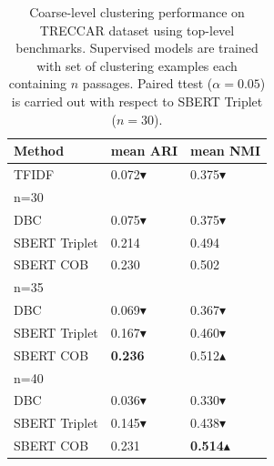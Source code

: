 \documentclass[11pt,a4paper]{article}
\begin{document}
\begin{table}[h]
\caption{Coarse-level clustering performance on TRECCAR dataset using top-level benchmarks. Supervised models are trained with set of clustering examples each containing $n$ passages. Paired ttest ($\alpha=0.05$) is carried out with respect to SBERT Triplet ($n=30$).}
\label{tab:trecexp}
\begin{tabular}{lll}
\hline
Method        & mean ARI & mean NMI \\ \hline
TFIDF         & 0.072$\blacktriangledown$ & 0.375$\blacktriangledown$ \\ \hline
n=30&&\\
DBC           & 0.075$\blacktriangledown$ & 0.375$\blacktriangledown$ \\ 
SBERT Triplet & 0.214 & 0.494 \\
SBERT COB     & 0.230 & 0.502 \\ \hline
n=35&&\\
DBC           & 0.069$\blacktriangledown$ & 0.367$\blacktriangledown$ \\ 
SBERT Triplet & 0.167$\blacktriangledown$ & 0.460$\blacktriangledown$ \\
SBERT COB     & \textbf{0.236} & 0.512$\blacktriangle$ \\ \hline
n=40&&\\
DBC           & 0.036$\blacktriangledown$ & 0.330$\blacktriangledown$ \\ 
SBERT Triplet & 0.145$\blacktriangledown$ & 0.438$\blacktriangledown$ \\
SBERT COB     & 0.231 & \textbf{0.514}$\blacktriangle$  
\end{tabular}
\end{table}
\end{document}
